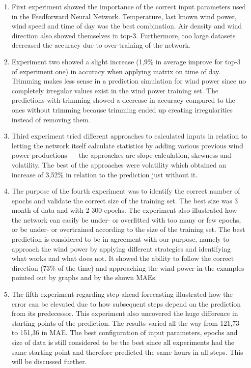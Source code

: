 \begin{enumerate}
\item First experiment showed the importance of the correct input parameters used in the Feedforward Neural Network. Temperature, last known wind power, wind speed and time of day was the best combination. Air density and wind direction also showed themselves in top-3. Furthermore, too large datasets decreased the accuracy due to over-training of the network.
\item Experiment two showed a slight increase (1,9\% in average improve for top-3 of experiment one) in accuracy when applying matrix on time of day. Trimming makes less sense in a prediction simulation for wind power since no completely irregular values exist in the wind power training set. The predictions with trimming showed a decrease in accuracy compared to the ones without trimming because trimming ended up creating irregularities instead of removing them.
\item Third experiment tried different approaches to calculated inputs in relation to letting the network itself calculate statistics by adding various previous wind power productions --- the approaches are slope calculation, skewness and volatility. The best of the approaches were volatility which obtained an increase of 3,52\% in relation to the prediction just without it.
\item The purpose of the fourth experiment was to identify the correct number of epochs and validate the correct size of the training set. The best size was 3 month of data and with 2-300 epochs. The experiment also illustrated how the network can easily be under- or overfitted with too many or few epochs, or be under- or overtrained  according to the size of the training set. The best prediction is considered to be in agreement with our purpose, namely to approach the wind power by applying different strategies and identifying what works and what does not. It showed the ability to follow the correct direction (73\% of the time) and approaching the wind power in the examples pointed out by graphs and by the shown MAEs.	
\item The fifth experiment regarding step-ahead forecasting illustrated how the error can be elevated due to how subsequent steps depend on the prediction from its predecessor. This experiment also uncovered the huge difference in starting points of the prediction. The results varied all the way from 121,73 to 151,36 in MAE. The best configuration of input parameters, epochs and size of data is still considered to be the best since all experiments had the same starting point and therefore predicted the same hours in all steps. This will be discussed further.
\end{enumerate}

